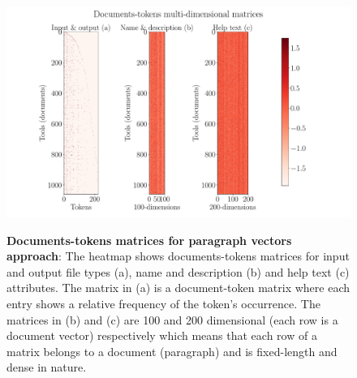 \begin{figure}[h]
\begin{centering}
    {\includegraphics[scale=0.4]{figures/Documents-tokens_doc2vec.pdf}}
    \caption[Documents-tokens matrices for paragraph vectors approach]{\textbf{Documents-tokens matrices for paragraph vectors approach}: The heatmap shows documents-tokens matrices for input and output file types (a), name and description (b) and help text (c) attributes. The matrix in (a) is a document-token matrix where each entry shows a relative frequency of the token's occurrence. The matrices in (b) and (c) are 100 and 200 dimensional (each row is a document vector) respectively which means that each row of a matrix belongs to a document (paragraph) and is fixed-length and dense in nature. }
\end{centering}
\end{figure}

